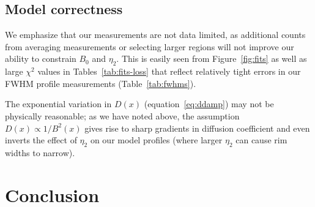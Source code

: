 \documentclass[iop, apj, numberedappendix]{emulateapj}
\newcommand*{\mt}{\mathrm}
\newcommand*{\Ecut}{E_{\mt{cut}}}
\newcommand*{\Bmin}{B_{\mt{min}}}
\begin{document}
\subsection{Model correctness}

We emphasize that our measurements are not data limited, as additional counts
from averaging measurements or selecting larger regions will not improve our
ability to constrain $B_0$ and $\eta_2$.  This is easily seen from
Figure~\ref{fig:fits} as well as large $\chi^2$ values in
Tables~\ref{tab:fits-loss} that reflect relatively tight errors in our FWHM
profile measurements (Table~\ref{tab:fwhms}).

The exponential variation in $D(x)$ (equation~\eqref{eq:ddamp}) may not be
physically reasonable; as we have noted above, the assumption $D(x)
\propto 1 / B^2(x)$ gives rise to sharp gradients in diffusion coefficient and
even inverts the effect of $\eta_2$ on our model profiles (where larger
$\eta_2$ can cause rim widths to narrow).




\section{Conclusion}
\end{document}
